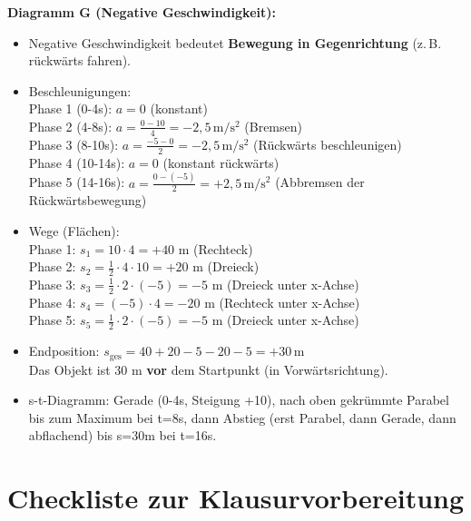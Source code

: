 \documentclass[11pt,a4paper]{article}
\begin{document}
\vspace{0.3cm}
\textbf{Diagramm G (Negative Geschwindigkeit):}
\begin{itemize}
\item[a)] Negative Geschwindigkeit bedeutet \textbf{Bewegung in Gegenrichtung} (z.\,B. rückwärts fahren).
\item[b)] Beschleunigungen:\\
Phase 1 (0-4s): $a = 0$ (konstant)\\
Phase 2 (4-8s): $a = \frac{0-10}{4} = -2{,}5\,\mathrm{m/s^2}$ (Bremsen)\\
Phase 3 (8-10s): $a = \frac{-5-0}{2} = -2{,}5\,\mathrm{m/s^2}$ (Rückwärts beschleunigen)\\
Phase 4 (10-14s): $a = 0$ (konstant rückwärts)\\
Phase 5 (14-16s): $a = \frac{0-(-5)}{2} = +2{,}5\,\mathrm{m/s^2}$ (Abbremsen der Rückwärtsbewegung)
\item[c)] Wege (Flächen):\\
Phase 1: $s_1 = 10 \cdot 4 = +40$ m (Rechteck)\\
Phase 2: $s_2 = \frac{1}{2} \cdot 4 \cdot 10 = +20$ m (Dreieck)\\
Phase 3: $s_3 = \frac{1}{2} \cdot 2 \cdot (-5) = -5$ m (Dreieck unter x-Achse)\\
Phase 4: $s_4 = (-5) \cdot 4 = -20$ m (Rechteck unter x-Achse)\\
Phase 5: $s_5 = \frac{1}{2} \cdot 2 \cdot (-5) = -5$ m (Dreieck unter x-Achse)
\item[d)] Endposition: $s_{\text{ges}} = 40 + 20 - 5 - 20 - 5 = \boxed{+30\,\mathrm{m}}$\\
Das Objekt ist 30 m \textbf{vor} dem Startpunkt (in Vorwärtsrichtung).
\item[e)] s-t-Diagramm: Gerade (0-4s, Steigung +10), nach oben gekrümmte Parabel bis zum Maximum bei t=8s, dann Abstieg (erst Parabel, dann Gerade, dann abflachend) bis s=30m bei t=16s.
\end{itemize}

\newpage
\section{Checkliste zur Klausurvorbereitung}
\end{document}
